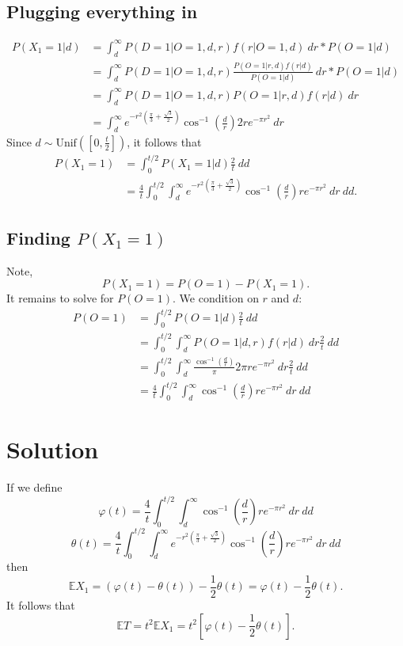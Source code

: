 \documentclass{article}
\begin{document}
\subsection{Plugging everything in}
\begin{equation}
\begin{split}
P(X_1 = 1|d) &= \int_d^\infty P(D = 1 | O = 1, d, r) f(r | O = 1, d) \:dr * P(O = 1 | d) \\
&= \int_d^\infty P(D = 1 | O = 1, d, r) \frac{P(O=1 | r,d)f(r | d)}{P(O=1 | d)} \:dr * P(O = 1 | d) \\
&= \int_d^\infty P(D = 1 | O = 1, d, r) P(O=1 | r,d)f(r | d) \:dr \\
&= \int_d^\infty e^{- r^2\left(\frac{\pi}{3} + \frac{\sqrt{3}}{2}\right)}\cos^{-1}\left(\frac{d}{r}\right)2re^{-\pi r^2} \:dr
\end{split}
\end{equation}
Since $d \sim \textrm{Unif}([0,\frac{t}{2}])$, it follows that
\begin{equation}
\begin{split}
P(X_1 = 1) &= \int_0^{t/2} P(X_1 = 1 | d) \frac{2}{t} \:dd \\
&= \frac{4}{t} \int_0^{t/2} \int_d^\infty e^{- r^2\left(\frac{\pi}{3} + \frac{\sqrt{3}}{2}\right)}\cos^{-1}\left(\frac{d}{r}\right)re^{-\pi r^2} \:dr \:dd.
\end{split}
\end{equation}

\subsection{Finding $P(X_1 = 1)$}
Note, 
$$P(X_1 = 1) = P(O = 1) - P(X_1 = 1).$$
It remains to solve for $P(O = 1)$. We condition on $r$ and $d$:
\begin{equation}
\begin{split}
P(O = 1) &= \int_0^{t/2} P(O = 1 | d) \frac{2}{t} \:dd \\
&= \int_0^{t/2} \int_d^\infty P(O = 1 | d,r) f(r|d) \:dr \frac{2}{t} \:dd \\
&= \int_0^{t/2} \int_d^\infty \frac{\cos^{-1}\left(\frac{d}{r}\right)}{\pi} 2\pi r e^{-\pi r^2} \:dr \frac{2}{t} \:dd \\
&= \frac{4}{t}\int_0^{t/2} \int_d^\infty \cos^{-1}\left(\frac{d}{r}\right) re^{-\pi r^2} \:dr \:dd
\end{split}
\end{equation}

\section{Solution}
If we define
$$\varphi(t) = \frac{4}{t}\int_0^{t/2} \int_d^\infty \cos^{-1}\left(\frac{d}{r}\right) re^{-\pi r^2} \:dr \:dd$$
$$\theta(t) = \frac{4}{t} \int_0^{t/2} \int_d^\infty e^{- r^2\left(\frac{\pi}{3} + \frac{\sqrt{3}}{2}\right)}\cos^{-1}\left(\frac{d}{r}\right)re^{-\pi r^2} \:dr \:dd$$
then
$$\mathbb{E}X_1 = (\varphi(t) - \theta(t)) - \frac{1}{2}\theta(t) = \varphi(t) - \frac{1}{2}\theta(t).$$
It follows that
$$\mathbb{E}T = t^2\mathbb{E}X_1 = t^2\left[\varphi(t) - \frac{1}{2}\theta(t)\right].$$
\end{document}

